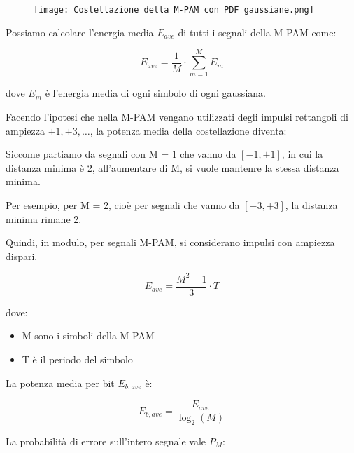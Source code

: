 \begin{figure}[h]
    \centering
    \texttt{[image: Costellazione della M-PAM con PDF gaussiane.png]}
\end{figure}

Possiamo calcolare l'energia media $E_{ave}$ di tutti i segnali della M-PAM come: 

{
    \Large 
    \begin{equation}
        E_{ave}
        = 
        \frac{1}{M}
        \cdot
        \sum_{m = 1}^{M}
        E_m
    \end{equation}
}

dove $E_m$ è l'energia media di ogni simbolo di ogni gaussiana. \newline 

Facendo l'ipotesi che nella M-PAM vengano utilizzati degli impulsi rettangoli di ampiezza $\pm 1, \pm 3, \dots$, 
la potenza media della costellazione diventa: 

\begin{tcolorbox}
Siccome partiamo da segnali con M = 1 che vanno da $[-1, +1 ]$, in cui la distanza minima è 2, 
all'aumentare di M, si vuole mantenre la stessa distanza minima. \newline 

Per esempio, per M = 2, cioè per segnali che vanno da $[-3, +3]$, la distanza minima rimane 2. \newline 

Quindi, in modulo, per segnali M-PAM, si considerano impulsi con ampiezza dispari. 
\end{tcolorbox}

{
    \Large 
    \begin{equation}
        E_{ave} = \frac{M ^{2} - 1}{3} \cdot T
    \end{equation}
}

dove: 

\begin{itemize}
    \item M sono i simboli della M-PAM 
    \item T è il periodo del simbolo
\end{itemize}

La potenza media per bit $E_{b, ave}$ è: 

{
    \Large 
    \begin{equation}
        E_{b, ave}
        =
        \frac{E_{ave}}{\log_{2} (M)}
    \end{equation}
}

La probabilità di errore sull'intero segnale vale $P_M$:

